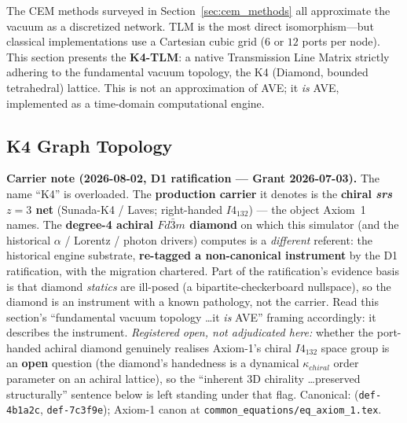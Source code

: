 The CEM methods surveyed in Section~\ref{sec:cem_methods} all approximate the vacuum as a discretized network. TLM is the most direct isomorphism---but classical implementations use a Cartesian cubic grid ($6$ or $12$ ports per node). This section presents the \textbf{K4-TLM}: a native Transmission Line Matrix strictly adhering to the fundamental vacuum topology, the K4 (Diamond, bounded tetrahedral) lattice. This is not an approximation of AVE; it \textit{is} AVE, implemented as a time-domain computational engine.

\subsection{K4 Graph Topology}

\noindent\textbf{Carrier note (2026-08-02, D1 ratification --- Grant 2026-07-03).} The name ``K4'' is overloaded. The \textbf{production carrier} it denotes is the \textbf{chiral \emph{srs} $z = 3$ net} (Sunada-K4 / Laves; right-handed $I4_132$) --- the object Axiom~1 names. The \textbf{degree-4 achiral $Fd\bar{3}m$ diamond} on which this simulator (and the historical $\alpha$ / Lorentz / photon drivers) computes is a \emph{different} referent: the historical engine substrate, \textbf{re-tagged a non-canonical instrument} by the D1 ratification, with the migration chartered. Part of the ratification's evidence basis is that diamond \emph{statics} are ill-posed (a bipartite-checkerboard nullspace), so the diamond is an instrument with a known pathology, not the carrier. Read this section's ``fundamental vacuum topology \ldots it \emph{is} AVE'' framing accordingly: it describes the instrument. \emph{Registered open, not adjudicated here:} whether the port-handed achiral diamond genuinely realises Axiom-1's chiral $I4_132$ space group is an \textbf{open} question (the diamond's handedness is a dynamical $\kappa_{chiral}$ order parameter on an achiral lattice), so the ``inherent 3D chirality \ldots preserved structurally'' sentence below is left standing under that flag. Canonical:  (\texttt{def-4b1a2c}, \texttt{def-7c3f9e}); Axiom-1 canon at \texttt{common\_equations/eq\_axiom\_1.tex}.

